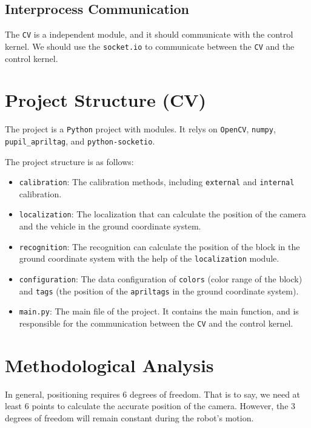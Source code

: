 \documentclass{article}
\begin{document}
\subsection{Interprocess Communication}

The \texttt{CV} is a independent module, and it should communicate with the control kernel. We should use the \texttt{socket.io} to communicate between the \texttt{CV} and the control kernel.

\section{Project Structure (CV)}

The project is a \texttt{Python} project with modules. It relys on \texttt{OpenCV}, \texttt{numpy}, \texttt{pupil\_apriltag}, and \texttt{python-socketio}.

The project structure is as follows:

\begin{itemize}
  \item \texttt{calibration}: The calibration methods, including \texttt{external} and \texttt{internal} calibration.
  \item \texttt{localization}: The localization that can calculate the position of the camera and the vehicle in the ground coordinate system.
  \item \texttt{recognition}: The recognition can calculate the position of the block in the ground coordinate system with the help of the \texttt{localization} module.
  \item \texttt{configuration}: The data configuration of \texttt{colors} (color range of the block) and \texttt{tags} (the position of the \texttt{apriltags} in the ground coordinate system).
  \item \texttt{main.py}: The main file of the project. It contains the main function, and is responsible for the communication between the \texttt{CV} and the control kernel.
\end{itemize}

\section{Methodological Analysis}
In general, positioning requires $6$ degrees of freedom. That is to say, we need at least $6$ points to calculate the accurate position of the camera. However, the $3$ degrees of freedom will remain constant during the robot's motion.
\end{document}
